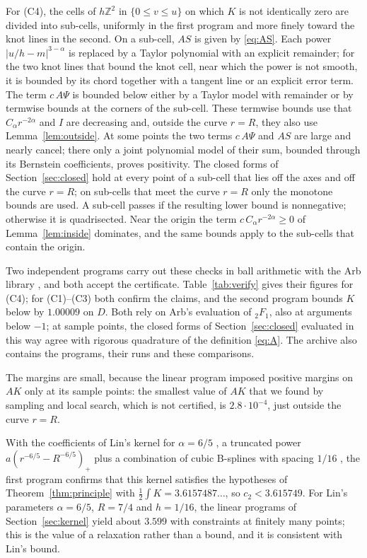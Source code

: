 \documentclass[11pt]{amsart}
\theoremstyle{definition}
\theoremstyle{remark}
\numberwithin{equation}{section}
\newcommand{\Z}{\mathbb{Z}}
\newcommand{\LocalMinA}{2.8\cdot10^{-4}}
\begin{document}
For (C4), the cells of $h\Z^2$ in $\{0\le v\le u\}$ on which $K$ is not identically zero are divided into sub-cells, uniformly in the first program and more finely toward the knot lines in the second. On a sub-cell, $AS$ is given by \eqref{eq:AS}. Each power $|u/h-m|^{3-\alpha}$ is replaced by a Taylor polynomial with an explicit remainder; for the two knot lines that bound the knot cell, near which the power is not smooth, it is bounded by its chord together with a tangent line or an explicit error term. The term $c\,A\Psi$ is bounded below either by a Taylor model with remainder or by termwise bounds at the corners of the sub-cell. These termwise bounds use that $C_\alpha r^{-2\alpha}$ and $I$ are decreasing and, outside the curve $r=R$, they also use Lemma~\ref{lem:outside}. At some points the two terms $c\,A\Psi$ and $AS$ are large and nearly cancel; there only a joint polynomial model of their sum, bounded through its Bernstein coefficients, proves positivity. The closed forms of Section~\ref{sec:closed} hold at every point of a sub-cell that lies off the axes and off the curve $r=R$; on sub-cells that meet the curve $r=R$ only the monotone bounds are used. A sub-cell passes if the resulting lower bound is nonnegative; otherwise it is quadrisected. Near the origin the term $c\,C_\alpha r^{-2\alpha}\ge0$ of Lemma~\ref{lem:inside} dominates, and the same bounds apply to the sub-cells that contain the origin.

Two independent programs carry out these checks in ball arithmetic with the Arb library \cite{Joh17}, and both accept the certificate. Table~\ref{tab:verify} gives their figures for (C4); for (C1)--(C3) both confirm the claims, and the second program bounds $K$ below by $1.00009$ on $D$. Both rely on Arb's evaluation of ${}_2F_1$, also at arguments below $-1$; at sample points, the closed forms of Section~\ref{sec:closed} evaluated in this way agree with rigorous quadrature of the definition \eqref{eq:A}. The archive also contains the programs, their runs and these comparisons.

The margins are small, because the linear program imposed positive margins on $AK$ only at its sample points: the smallest value of $AK$ that we found by sampling and local search, which is not certified, is $\LocalMinA$, just outside the curve $r=R$.

With the coefficients of Lin's kernel for $\alpha=6/5$ \cite{Lin26d}, a truncated power $a(r^{-6/5}-R^{-6/5})_+$ plus a combination of cubic B-splines with spacing $1/16$ \cite{Lin26a,Lin26c}, the first program confirms that this kernel satisfies the hypotheses of Theorem~\ref{thm:principle} with $\frac12\int K=3.6157487\ldots$, so $c_2<3.615749$. For Lin's parameters $\alpha=6/5$, $R=7/4$ and $h=1/16$, the linear programs of Section~\ref{sec:kernel} yield about $3.599$ with constraints at finitely many points; this is the value of a relaxation rather than a bound, and it is consistent with Lin's bound.
\end{document}
